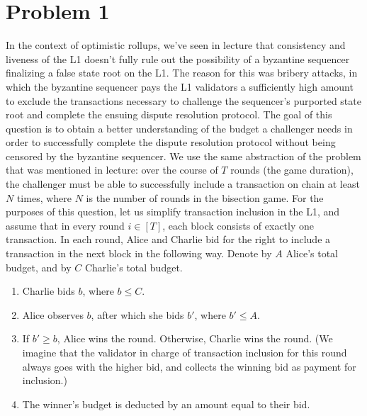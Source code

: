 \documentclass{article}
\title{\coursename \exerciseset}
\author{\studentname \qquad UNI: \suid}
\date{}
\begin{document}
\maketitle


\section*{Problem 1}

In the context of optimistic rollups, we've seen in lecture that consistency and liveness of the L1 doesn't fully rule out the possibility of a byzantine sequencer finalizing a false state root on the L1. The reason for this was bribery attacks, in which the byzantine sequencer pays the L1 validators a sufficiently high amount to exclude the transactions necessary to challenge the sequencer's purported state root and complete the ensuing dispute resolution protocol. The goal of this question is to obtain a better understanding of the budget a challenger needs in order to successfully complete the dispute resolution protocol without being censored by the byzantine sequencer. We use the same abstraction of the problem that was mentioned in lecture: over the course of $T$ rounds (the game duration), the challenger must be able to successfully include a transaction on chain at least $N$ times, where $N$ is the number of rounds in the bisection game. For the purposes of this question, let us simplify transaction inclusion in the L1, and assume that in every round $i \in [T]$, each block consists of exactly one transaction. In each round, Alice and Charlie bid for the right to include a transaction in the next block in the following way. Denote by $A$ Alice's total budget, and by $C$ Charlie's total budget.

\begin{enumerate}
\item Charlie bids $b$, where $b \leq C$.

\item Alice observes $b$, after which she bids $b'$, where $b' \leq A$.

\item If $b' \geq b$, Alice wins the round. Otherwise, Charlie wins the round. (We imagine that the validator in charge of transaction inclusion for this round always goes with the higher bid, and collects the winning bid as payment for inclusion.)

\item The winner's budget is deducted by an amount equal to their bid.
\end{enumerate}
\end{document}
